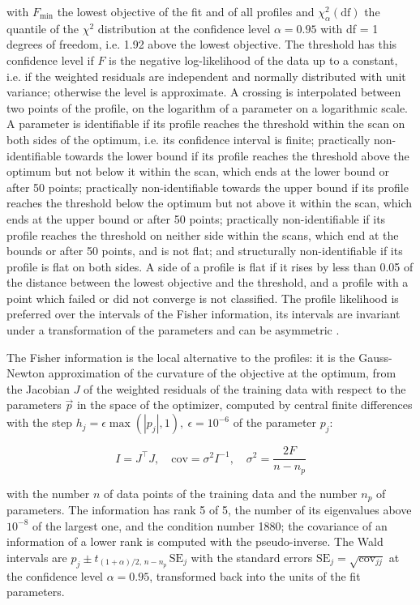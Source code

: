 with $F_{\min}$ the lowest objective of the fit and of all profiles and $\chi^2_{\alpha}(\mathrm{df})$ the quantile of the $\chi^2$ distribution at the confidence level $\alpha = 0.95$ with df = 1 degrees of freedom, i.e. 1.92 above the lowest objective. The threshold has this confidence level if $F$ is the negative log-likelihood of the data up to a constant, i.e. if the weighted residuals are independent and normally distributed with unit variance; otherwise the level is approximate. A crossing is interpolated between two points of the profile, on the logarithm of a parameter on a logarithmic scale. A parameter is identifiable if its profile reaches the threshold within the scan on both sides of the optimum, i.e. its confidence interval is finite; practically non-identifiable towards the lower bound if its profile reaches the threshold above the optimum but not below it within the scan, which ends at the lower bound or after 50 points; practically non-identifiable towards the upper bound if its profile reaches the threshold below the optimum but not above it within the scan, which ends at the upper bound or after 50 points; practically non-identifiable if its profile reaches the threshold on neither side within the scans, which end at the bounds or after 50 points, and is not flat; and structurally non-identifiable if its profile is flat on both sides. A side of a profile is flat if it rises by less than 0.05 of the distance between the lowest objective and the threshold, and a profile with a point which failed or did not converge is not classified. The profile likelihood is preferred over the intervals of the Fisher information, its intervals are invariant under a transformation of the parameters and can be asymmetric \cite{Wieland2021}.

The Fisher information is the local alternative to the profiles: it is the Gauss-Newton approximation of the curvature of the objective at the optimum, from the Jacobian $J$ of the weighted residuals of the training data with respect to the parameters $\vec{p}$ in the space of the optimizer, computed by central finite differences with the step $h_j = \epsilon \max(|p_j|, 1),\ \epsilon = 10^{-6}$ of the parameter $p_j$:

\begin{equation}
I = J^\top J, \quad \mathrm{cov} = \sigma^2 I^{-1}, \quad \sigma^2 = \frac{2 F}{n - n_p}
\end{equation}

with the number $n$ of data points of the training data and the number $n_p$ of parameters. The information has rank 5 of 5, the number of its eigenvalues above $10^{-8}$ of the largest one, and the condition number 1880; the covariance of an information of a lower rank is computed with the pseudo-inverse. The Wald intervals are $\hat{p}_j \pm t_{(1+\alpha)/2,\, n-n_p}\, \mathrm{SE}_j$ with the standard errors $\mathrm{SE}_j = \sqrt{\mathrm{cov}_{jj}}$ at the confidence level $\alpha = 0.95$, transformed back into the units of the fit parameters.

